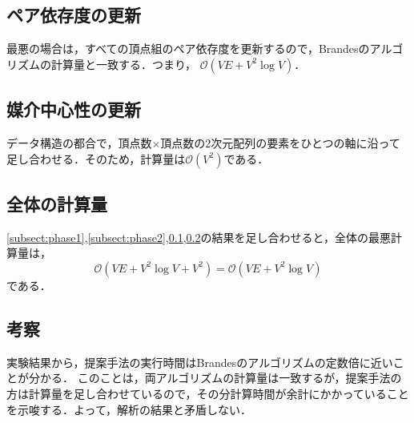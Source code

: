 \subsection{ペア依存度の更新}
\label{subsect:phase3}
最悪の場合は，すべての頂点組のペア依存度を更新するので，Brandesのアルゴリズムの計算量と一致する．つまり，
$\mathcal{O}(VE+V^2\log V)$．

\subsection{媒介中心性の更新}
\label{subsect:phase4}
データ構造の都合で，頂点数$\times$頂点数の2次元配列の要素をひとつの軸に沿って足し合わせる．そのため，計算量は$\mathcal{O}(V^2)$である．

\subsection{全体の計算量}
\ref{subsect:phase1},\ref{subsect:phase2},\ref{subsect:phase3},\ref{subsect:phase4}の結果を足し合わせると，全体の最悪計算量は，
\[ \mathcal{O}(VE+V^2\log V+V^2)=\mathcal{O}(VE+V^2\log V) \]
である．

\subsection{考察}
実験結果から，提案手法の実行時間はBrandesのアルゴリズムの定数倍に近いことが分かる．
このことは，両アルゴリズムの計算量は一致するが，提案手法の方は計算量を足し合わせているので，その分計算時間が余計にかかっていることを示唆する．よって，解析の結果と矛盾しない．


